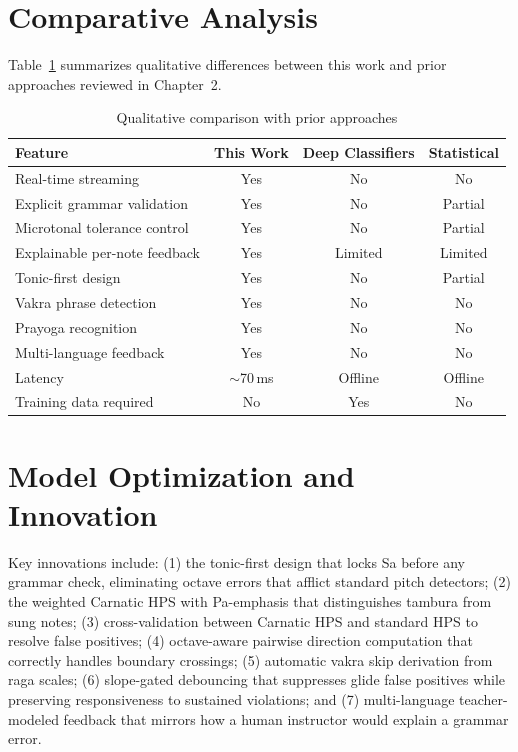 \documentclass[12pt,a4paper]{report}
\numberwithin{equation}{chapter}
\begin{document}
\section{Comparative Analysis}
Table~\ref{tab:compare} summarizes qualitative differences between this work and prior approaches reviewed in Chapter~2.

\begin{table}[htbp]
\centering
\caption{Qualitative comparison with prior approaches}
\label{tab:compare}
\small
\begin{tabular}{|l|c|c|c|}
\hline
\textbf{Feature} & \textbf{This Work} & \textbf{Deep Classifiers} & \textbf{Statistical} \\
\hline
Real-time streaming          & Yes       & No      & No \\
Explicit grammar validation  & Yes       & No      & Partial \\
Microtonal tolerance control & Yes       & No      & Partial \\
Explainable per-note feedback& Yes       & Limited & Limited \\
Tonic-first design           & Yes       & No      & Partial \\
Vakra phrase detection       & Yes       & No      & No \\
Prayoga recognition          & Yes       & No      & No \\
Multi-language feedback      & Yes       & No      & No \\
Latency                      & $\sim$70\,ms & Offline & Offline \\
Training data required       & No        & Yes     & No \\
\hline
\end{tabular}
\end{table}

\section{Model Optimization and Innovation}
Key innovations include: (1) the tonic-first design that locks Sa before any grammar check, eliminating octave errors that afflict standard pitch detectors; (2) the weighted Carnatic HPS with Pa-emphasis that distinguishes tambura from sung notes; (3) cross-validation between Carnatic HPS and standard HPS to resolve false positives; (4) octave-aware pairwise direction computation that correctly handles boundary crossings; (5) automatic vakra skip derivation from raga scales; (6) slope-gated debouncing that suppresses glide false positives while preserving responsiveness to sustained violations; and (7) multi-language teacher-modeled feedback that mirrors how a human instructor would explain a grammar error.
\end{document}
